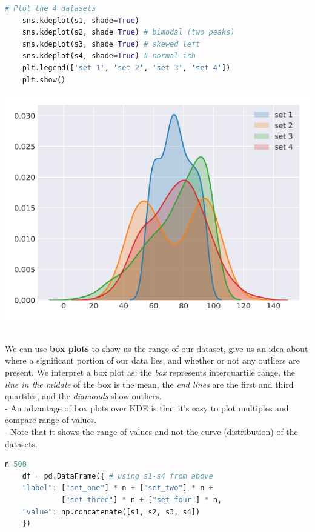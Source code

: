 \documentclass[11pt, a4paper]{article}
\begin{document}
\begin{spacing}{1.1}
\begin{minipage}[c]{10.3cm}
\begin{lstlisting}[language=Python]
	# Plot the 4 datasets
	sns.kdeplot(s1, shade=True) 
	sns.kdeplot(s2, shade=True) # bimodal (two peaks)
	sns.kdeplot(s3, shade=True) # skewed left
	sns.kdeplot(s4, shade=True) # normal-ish
	plt.legend(['set 1', 'set 2', 'set 3', 'set 4'])
	plt.show() \end{lstlisting}\vspace*{1mm}
	\end{minipage}
	\begin{minipage}[c]{10cm}
	\includegraphics[scale=.48]{kde}
	\end{minipage} \\
	We can use \textbf{box plots} to show us the range of our dataset, give us an idea about where a significant portion of our data lies, and whether or not any outliers are present. We interpret a box plot as: the \textit{box} represents interquartile range, the \textit{line in the middle} of the box is the mean, the \textit{end lines} are the first and third quartiles, and the \textit{diamonds} show outliers. \\
	\hspace*{3mm} - An advantage of box plots over KDE is that it's easy to plot multiples and compare range of values. \\
	\hspace*{3mm} - Note that it shows the range of values and not the curve (distribution) of the datasets. \\
	\begin{minipage}[c]{10.3cm}
	\begin{lstlisting}[language=Python]
	n=500
	df = pd.DataFrame({ # using s1-s4 from above
	"label": ["set_one"] * n + ["set_two"] * n + 
	         ["set_three"] * n + ["set_four"] * n,
	"value": np.concatenate([s1, s2, s3, s4])
	})
	

\end{lstlisting}
\end{minipage}
\end{spacing}
\end{document}
